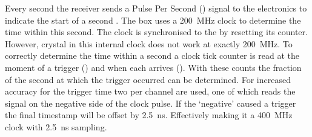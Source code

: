 Every second the \gps receiver sends a Pulse Per Second (\pps) signal to the \hisparc electronics to indicate the start of a second \cite{verkooijen2008firmware}. The \hisparc box uses a \SI{200}{\mega\hertz} clock to determine the time within this second. The clock is synchronised to the \pps by resetting its counter. However, crystal in this internal clock does not work at exactly \SI{200}{\mega\hertz}. To correctly determine the time within a second a clock tick counter is read at the moment of a trigger (\ctd) and when each \pps arrives (\ctp). With these counts the fraction of the second at which the trigger occurred can be determined. For increased accuracy for the trigger time two \adcs per channel are used, one of which reads the signal on the negative side of the clock pulse. If the `negative' \adc caused a trigger the final timestamp will be offset by \SI{2.5}{\ns}. Effectively making it a \SI{400}{\mega\hertz} clock with \SI{2.5}{\ns} sampling.

